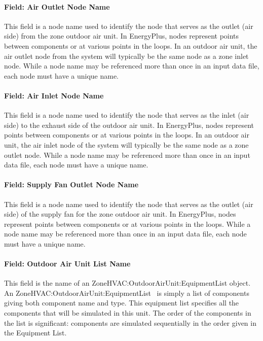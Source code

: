 \paragraph{Field: Air Outlet Node Name}\label{field-air-outlet-node-name-3-003}

This field is a node name used to identify the node that serves as the outlet (air side) from the zone outdoor air unit. In EnergyPlus, nodes represent points between components or at various points in the loops. In an outdoor air unit, the air outlet node from the system will typically be the same node as a zone inlet node. While a node name may be referenced more than once in an input data file, each node must have a unique name.

\paragraph{Field: Air Inlet Node Name}\label{field-air-inlet-node-name-3-003}

This field is a node name used to identify the node that serves as the inlet (air side) to the exhaust side of the outdoor air unit. In EnergyPlus, nodes represent points between components or at various points in the loops. In an outdoor air unit, the air inlet node of the system will typically be the same node as a zone outlet node. While a node name may be referenced more than once in an input data file, each node must have a unique name.

\paragraph{Field: Supply Fan Outlet Node Name}\label{field-supply-fan-outlet-node-name}

This field is a node name used to identify the node that serves as the outlet (air side) of the supply fan for the zone outdoor air unit. In EnergyPlus, nodes represent points between components or at various points in the loops. While a node name may be referenced more than once in an input data file, each node must have a unique name.

\paragraph{Field: Outdoor Air Unit List Name}\label{field-outdoor-air-unit-list-name}

This field is the name of an ZoneHVAC:OutdoorAirUnit:EquipmentList object. An ZoneHVAC:OutdoorAirUnit:EquipmentList ~is simply a list of components giving both component name and type. This equipment list specifies all the components that will be simulated in this unit. The order of the components in the list is significant: components are simulated sequentially in the order given in the Equipment List.


